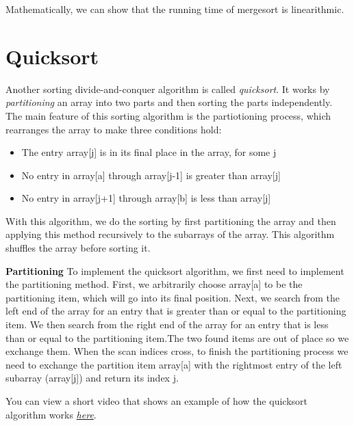  Mathematically, we can show that the running time of mergesort is linearithmic.
 
 
 \section{Quicksort}
 
 
 Another sorting divide-and-conquer algorithm is called \textit{quicksort}. It works by \textit{partitioning} an array into two parts and then sorting the parts independently. The main feature of this sorting algorithm is the partiotioning process, which rearranges the array to make three conditions hold:

\begin{itemize}
\item The entry array[j] is in its final place in the array, for some j
\item No entry in array[a] through array[j-1] is greater than array[j]
\item No entry in array[j+1] through array[b] is less than array[j]
\end{itemize}

With this algorithm, we do the sorting by first partitioning the array and then applying this method recursively to the subarrays of the array. This algorithm shuffles the array before sorting it. 

\textbf{Partitioning} To implement the quicksort algorithm, we first need to implement the partitioning method. First, we arbitrarily choose array[a] to be the partitioning item, which will go into its final position. Next, we search from the left end of the array for an entry that is greater than or equal to the partitioning item. We then search from the right end of the array for an entry that is less than or equal to the partitioning item.The two found items are out of place so we exchange them. When the scan indices cross, to finish the partitioning process we need to exchange the partition item array[a] with the rightmost entry of the left subarray (array[j]) and return its index j.



You can view a short video that shows an example of how the quicksort algorithm works \href{https://youtu.be/Hoixgm4-P4M}{\textit{here}}.

